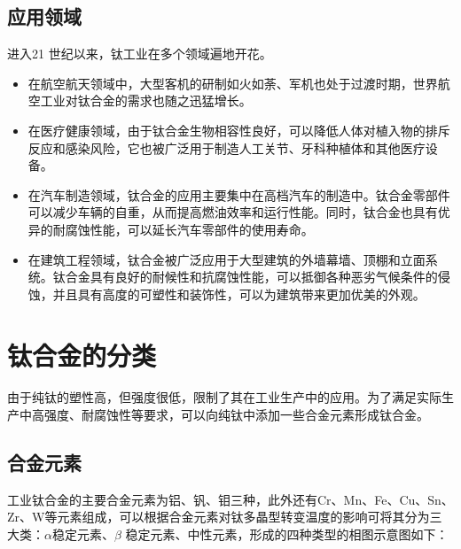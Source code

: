 \subsection{应用领域}

进入21 世纪以来，钛工业在多个领域遍地开花。
\begin{itemize}
	\item 	在航空航天领域中，大型客机的研制如火如荼、军机也处于过渡时期，世界航空工业对钛合金的需求也随之迅猛增长。
	\item 在医疗健康领域，由于钛合金生物相容性良好，可以降低人体对植入物的排斥反应和感染风险，它也被广泛用于制造人工关节、牙科种植体和其他医疗设备。
	\item 在汽车制造领域，钛合金的应用主要集中在高档汽车的制造中。钛合金零部件可以减少车辆的自重，从而提高燃油效率和运行性能。同时，钛合金也具有优异的耐腐蚀性能，可以延长汽车零部件的使用寿命。
	\item 在建筑工程领域，钛合金被广泛应用于大型建筑的外墙幕墙、顶棚和立面系统。钛合金具有良好的耐候性和抗腐蚀性能，可以抵御各种恶劣气候条件的侵蚀，并且具有高度的可塑性和装饰性，可以为建筑带来更加优美的外观。

\end{itemize}
\section{钛合金的分类}
由于纯钛的塑性高，但强度很低，限制了其在工业生产中的应用。为了满足实际生产中高强度、耐腐蚀性等要求，可以向纯钛中添加一些合金元素形成钛合金。
\subsection{合金元素}
工业钛合金的主要合金元素为铝、钒、钼三种，此外还有Cr、Mn、Fe、Cu、Sn、Zr、W等元素组成，可以根据合金元素对钛多晶型转变温度的影响可将其分为三大类：$\alpha$稳定元素、$\beta$ 稳定元素、中性元素，形成的四种类型的相图示意图如下：

